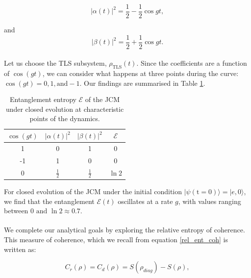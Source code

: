 \documentclass[11pt]{article}
\begin{document}
\begin{equation*}
    |\alpha(t)|^2 = \frac{1}{2} - \frac{1}{2}\cos gt,
\end{equation*}

and 
\begin{equation} \label{eqn:JCM_complex_coeffs}
    |\beta(t)|^2 = \frac{1}{2} + \frac{1}{2}\cos gt.
\end{equation}
\\
Let us choose the TLS subsystem, $\rho_{\scriptscriptstyle \text{TLS}}(t)$. Since the coefficients are a function of $\cos(gt)$, we can consider what happens at three points during the curve: $\cos(gt) = 0,1, \text{and} -1$. Our findings are summarised in Table \ref{tab:vne_JCM_closed}.

\begin{table}[H]
    \centering
    \begin{tabular}{c|c|c|c}
        \toprule
        $\cos(gt)$ & $|\alpha(t)|^2$ & $|\beta(t)|^2$ & $\mathcal{E}$ \\
        \midrule
        1   & 0   & 1   & 0 \\
        -1  & 1   & 0   & 0 \\
        0   & $\tfrac{1}{2}$ & $\tfrac{1}{2}$ & $\ln 2$ \\
        \bottomrule
    \end{tabular}
    \caption{Entanglement entropy $\mathcal{E}$ of the JCM under closed evolution at characteristic points of the dynamics.}
    \label{tab:vne_JCM_closed}
\end{table}

For closed evolution of the JCM under the initial condition $|\psi(\text{t} = 0)\rangle = |e,0\rangle$, we find that the entanglement $\mathcal{E}(t)$ oscillates at a rate $g$, with values ranging between $0 \text{ and } \ln2 \approx 0.7$.\\
\\
We complete our analytical goals by exploring the relative entropy of coherence. This measure of coherence, which we recall from equation \eqref{rel_ent_coh} is written as:

\begin{equation*}
C_r(\rho) = C_d(\rho) = S(\rho_{diag}) - S(\rho),
\end{equation*}
\end{document}
